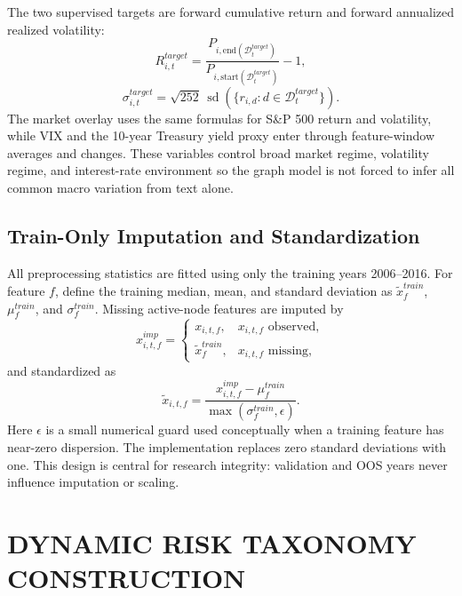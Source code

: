\documentclass[11pt, a4paper]{article}
\begin{document}
The two supervised targets are forward cumulative return and forward annualized realized volatility:
\begin{equation}
R^{target}_{i,t}=\frac{P_{i,\text{end}(\mathcal{D}^{target}_{t})}}{P_{i,\text{start}(\mathcal{D}^{target}_{t})}}-1,
\end{equation}
\begin{equation}
\sigma^{target}_{i,t}=\sqrt{252}\,\operatorname{sd}\left(\{r_{i,d}:d\in\mathcal{D}^{target}_{t}\}\right).
\end{equation}
The market overlay uses the same formulas for S\&P 500 return and volatility, while VIX and the 10-year Treasury yield proxy enter through feature-window averages and changes. These variables control broad market regime, volatility regime, and interest-rate environment so the graph model is not forced to infer all common macro variation from text alone.

\subsection{Train-Only Imputation and Standardization}
All preprocessing statistics are fitted using only the training years 2006--2016. For feature $f$, define the training median, mean, and standard deviation as $\widetilde{x}^{train}_{f}$, $\mu^{train}_{f}$, and $\sigma^{train}_{f}$. Missing active-node features are imputed by
\begin{equation}
x^{imp}_{i,t,f}=
\begin{cases}
x_{i,t,f}, & x_{i,t,f}\text{ observed},\\
\widetilde{x}^{train}_{f}, & x_{i,t,f}\text{ missing},
\end{cases}
\end{equation}
and standardized as
\begin{equation}
\widetilde{x}_{i,t,f}=\frac{x^{imp}_{i,t,f}-\mu^{train}_{f}}{\max(\sigma^{train}_{f},\epsilon)}.
\end{equation}
Here $\epsilon$ is a small numerical guard used conceptually when a training feature has near-zero dispersion. The implementation replaces zero standard deviations with one. This design is central for research integrity: validation and OOS years never influence imputation or scaling.

\section{DYNAMIC RISK TAXONOMY CONSTRUCTION}
\end{document}
